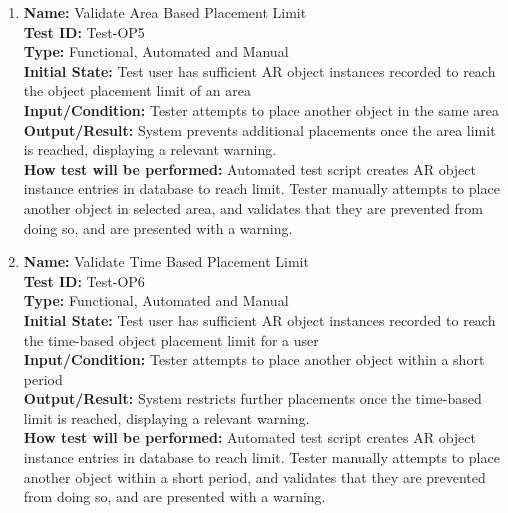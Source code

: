\documentclass[12pt, titlepage]{article}
\begin{document}
\begin{enumerate}
  \item \textbf{Name:} Validate Area Based Placement Limit \label{itm:Test-OP5} \\
        \textbf{Test ID:} Test-OP5 \\
        \textbf{Type:} Functional, Automated and Manual \\
        \textbf{Initial State:} Test user has sufficient AR object instances recorded to reach the object placement limit of an area  \\
        \textbf{Input/Condition:} Tester attempts to place another object in the same area \\
        \textbf{Output/Result:} System prevents additional placements once the area limit is reached, displaying a relevant warning. \\
        \textbf{How test will be performed:} Automated test script creates AR object instance entries in database to reach limit. Tester manually attempts to place another object in selected area, and validates that they are prevented from doing so, and are presented with a warning.

  \item \textbf{Name:} Validate Time Based Placement Limit \label{itm:Test-OP6} \\
        \textbf{Test ID:} Test-OP6 \\
        \textbf{Type:} Functional, Automated and Manual \\
        \textbf{Initial State:} Test user has sufficient AR object instances recorded to reach the time-based object placement limit for a user \\
        \textbf{Input/Condition:} Tester attempts to place another object within a short period \\
        \textbf{Output/Result:} System restricts further placements once the time-based limit is reached, displaying a relevant warning. \\
        \textbf{How test will be performed:} Automated test script creates AR object instance entries in database to reach limit. Tester manually attempts to place another object within a short period, and validates that they are prevented from doing so, and are presented with a warning.


\end{enumerate}
\end{document}
